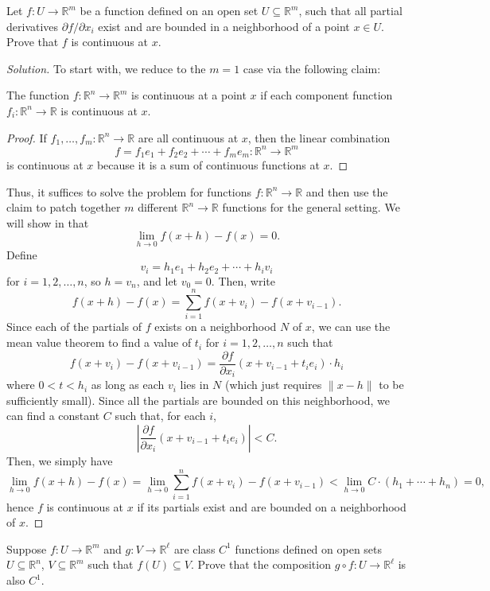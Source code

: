 \documentclass[11pt]{scrartcl}
\providecommand{\RR}{\mathbb R}
\newenvironment{soln}{\begin{proof}[Solution]}{\end{proof}}
\providecommand{\abs}[1]{\left|#1\right|}
\begin{document}
\begin{problem}
	Let $f\colon U\to\RR^m$ be a function defined on an open set
	$U\subseteq\RR^m$, such that all partial derivatives
	$\partial f/\partial x_i$ exist and are bounded in a neighborhood
	of a point $x\in U$. Prove that $f$ is continuous at $x$.
\end{problem}

\begin{soln}
	To start with, we reduce to the $m=1$ case via the following claim:
	\begin{claim}
		The function $f\colon\RR^n\to\RR^m$ is continuous at a point $x$
		if each component function $f_i\colon\RR^n\to\RR$ is continuous at $x$.
	\end{claim}
	\begin{proof}
		If $f_1,\dots,f_m\colon\RR^n\to\RR$
		are all continuous at $x$, then the linear combination
		\[f = f_1e_1 + f_2e_2 + \cdots + f_me_m \colon\RR^n\to\RR^m\]
		is continuous at $x$ because it is a sum of continuous functions at $x$.
	\end{proof}

	Thus, it suffices to solve the problem for functions $f\colon\RR^n\to\RR$
	and then use the claim to patch together $m$ different
	$\RR^n\to\RR$ functions for the general setting.
	We will show in that
	\[\lim_{h\to 0} f(x+h) - f(x) = 0.\]
	Define
	\[v_i = h_1e_1 + h_2e_2 + \cdots + h_iv_i\]
	for $i = 1,2,\dots,n$, so $h = v_n$, and let $v_0=0$. Then, write
	\[f(x + h) - f(x) = \sum_{i=1}^nf(x + v_i) - f(x + v_{i-1}).\]
	Since each of the partials of $f$ exists on a neighborhood $N$ of $x$,
	we can use the mean value theorem
	to find a value of $t_i$ for $i=1,2,\dots,n$ such that
	\[f(x + v_i) - f(x + v_{i-1}) =
	\frac{\partial f}{\partial x_i}(x + v_{i-1} + t_ie_i)\cdot h_i\]
	where $0 < t < h_i$ as long as each $v_i$ lies in $N$
	(which just requires $\|x-h\|$ to be sufficiently small).
	Since all the partials are bounded on this neighborhood,
	we can find a constant $C$ such that, for each $i$,
	\[\abs{\frac{\partial f}{\partial x_i}(x + v_{i-1} + t_ie_i)} < C.\]
	Then, we simply have
	\[\lim_{h\to 0} f(x+h) - f(x) =
	\lim_{h\to 0}\sum_{i=1}^nf(x + v_i) - f(x + v_{i-1}) <
	\lim_{h\to 0} C\cdot(h_1 + \cdots + h_n) = 0,\]
	hence $f$ is continuous at $x$ if its partials
	exist and are bounded on a neighborhood of $x$.
\end{soln}

\pagebreak
\begin{problem}
	Suppose $f\colon U\to\RR^m$ and $g\colon V\to\RR^\ell$
	are class $C^1$ functions defined on open sets
	$U\subseteq\RR^n$, $V\subseteq\RR^m$ such that $f(U)\subseteq V$.
	Prove that the composition $g\circ f\colon U\to\RR^\ell$ is also $C^1$.
\end{problem}
\end{document}
